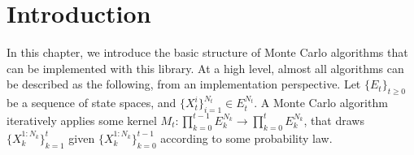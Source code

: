 %
%
%
%

\chapter{Introduction}
\label{chap:Introduction}

In this chapter, we introduce the basic structure of Monte Carlo algorithms
that can be implemented with this library. At a high level, almost all
algorithms can be described as the following, from an implementation
perspective. Let $\{E_t\}_{t\ge0}$ be a sequence of state spaces, and
$\{X_t^i\}_{i=1}^{N_t} \in E_t^{N_t}$. A Monte Carlo algorithm iteratively
applies some kernel $M_t:\prod_{k=0}^{t-1}E_k^{N_k}\to\prod_{k=0}^tE_k^{N_k}$,
that draws $\{X_k^{1:N_k}\}_{k=1}^t$ given $\{X_k^{1:N_k}\}_{k=0}^{t-1}$
according to some probability law.

